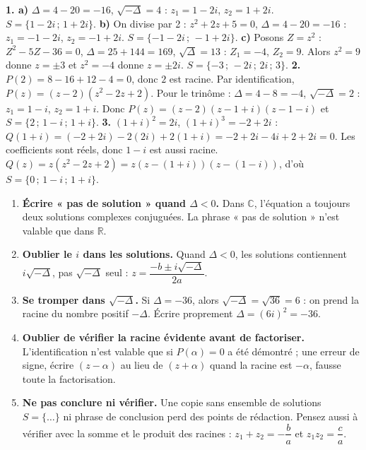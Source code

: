 \documentclass[11pt]{article}
\begin{document}
\begin{corrige}
\textbf{1. a)} $\Delta=4-20=-16$, $\sqrt{-\Delta}=4$ : $z_1=1-2i$, $z_2=1+2i$. $S=\{1-2i\,;\,1+2i\}$.
\textbf{b)} On divise par 2 : $z^2+2z+5=0$, $\Delta=4-20=-16$ : $z_1=-1-2i$, $z_2=-1+2i$. $S=\{-1-2i\,;\,-1+2i\}$.
\textbf{c)} Posons $Z=z^2$ : $Z^2-5Z-36=0$, $\Delta=25+144=169$, $\sqrt{\Delta}=13$ : $Z_1=-4$, $Z_2=9$. Alors $z^2=9$ donne $z=\pm 3$ et $z^2=-4$ donne $z=\pm 2i$. $S=\{-3\,;\,-2i\,;\,2i\,;\,3\}$.
\textbf{2.} $P(2)=8-16+12-4=0$, donc $2$ est racine. Par identification, $P(z)=(z-2)(z^2-2z+2)$. Pour le trinôme : $\Delta=4-8=-4$, $\sqrt{-\Delta}=2$ : $z_1=1-i$, $z_2=1+i$. Donc $P(z)=(z-2)(z-1+i)(z-1-i)$ et $S=\{2\,;\,1-i\,;\,1+i\}$.
\textbf{3.} $(1+i)^2=2i$, $(1+i)^3=-2+2i$ : $Q(1+i)=(-2+2i)-2(2i)+2(1+i)=-2+2i-4i+2+2i=0$. Les coefficients sont réels, donc $1-i$ est aussi racine. $Q(z)=z(z^2-2z+2)=z(z-(1+i))(z-(1-i))$, d'où $S=\{0\,;\,1-i\,;\,1+i\}$.
\end{corrige}

\begin{attention}
\begin{enumerate}
\item \textbf{Écrire « pas de solution » quand $\Delta<0$.} Dans $\mathbb{C}$, l'équation a toujours deux solutions complexes conjuguées. La phrase « pas de solution » n'est valable que dans $\mathbb{R}$.
\item \textbf{Oublier le $i$ dans les solutions.} Quand $\Delta<0$, les solutions contiennent $i\sqrt{-\Delta}$, pas $\sqrt{-\Delta}$ seul : $z=\dfrac{-b\pm i\sqrt{-\Delta}}{2a}$.
\item \textbf{Se tromper dans $\sqrt{-\Delta}$.} Si $\Delta=-36$, alors $\sqrt{-\Delta}=\sqrt{36}=6$ : on prend la racine du nombre positif $-\Delta$. Écrire proprement $\Delta=(6i)^2=-36$.
\item \textbf{Oublier de vérifier la racine évidente avant de factoriser.} L'identification n'est valable que si $P(\alpha)=0$ a été démontré ; une erreur de signe, écrire $(z-\alpha)$ au lieu de $(z+\alpha)$ quand la racine est $-\alpha$, fausse toute la factorisation.
\item \textbf{Ne pas conclure ni vérifier.} Une copie sans ensemble de solutions $S=\{\ldots\}$ ni phrase de conclusion perd des points de rédaction. Pensez aussi à vérifier avec la somme et le produit des racines : $z_1+z_2=-\dfrac{b}{a}$ et $z_1z_2=\dfrac{c}{a}$.
\end{enumerate}
\end{attention}
\end{document}
